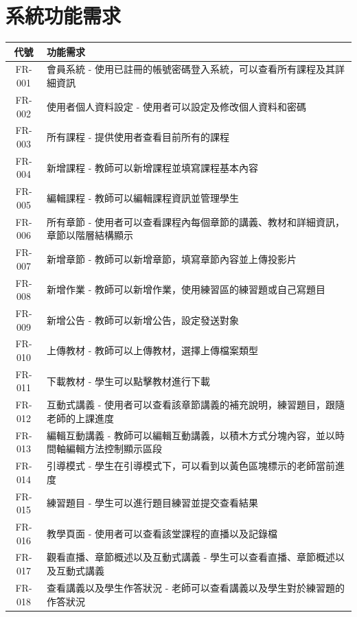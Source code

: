 \documentclass[12pt]{article}
\begin{document}
\section{系統功能需求}

\begin{table}[H]
  \centering
  \begin{tabular}{|c|p{15cm}|}
    \hline
    \textbf{代號} & \textbf{功能需求} \\
    \hline
    FR-001 & 會員系統 - 使用已註冊的帳號密碼登入系統，可以查看所有課程及其詳細資訊 \\  \hline
    FR-002 & 使用者個人資料設定 - 使用者可以設定及修改個人資料和密碼 \\  \hline
    FR-003 & 所有課程 - 提供使用者查看目前所有的課程 \\  \hline
    FR-004 & 新增課程 - 教師可以新增課程並填寫課程基本內容 \\  \hline
    FR-005 & 編輯課程 - 教師可以編輯課程資訊並管理學生 \\  \hline
    FR-006 & 所有章節 - 使用者可以查看課程內每個章節的講義、教材和詳細資訊，章節以階層結構顯示 \\  \hline
    FR-007 & 新增章節 - 教師可以新增章節，填寫章節內容並上傳投影片 \\  \hline
    FR-008 & 新增作業 - 教師可以新增作業，使用練習區的練習題或自己寫題目 \\  \hline
    FR-009 & 新增公告 - 教師可以新增公告，設定發送對象 \\  \hline
    FR-010 & 上傳教材 - 教師可以上傳教材，選擇上傳檔案類型 \\  \hline
    FR-011 & 下載教材 - 學生可以點擊教材進行下載 \\  \hline
    FR-012 & 互動式講義 - 使用者可以查看該章節講義的補充說明，練習題目，跟隨老師的上課進度 \\  \hline
    FR-013 & 編輯互動講義 - 教師可以編輯互動講義，以積木方式分塊內容，並以時間軸編輯方法控制顯示區段 \\  \hline
    FR-014 & 引導模式 - 學生在引導模式下，可以看到以黃色區塊標示的老師當前進度 \\  \hline
    FR-015 & 練習題目 - 學生可以進行題目練習並提交查看結果 \\  \hline
    FR-016 & 教學頁面 - 使用者可以查看該堂課程的直播以及記錄檔 \\  \hline
    FR-017 & 觀看直播、章節概述以及互動式講義 - 學生可以查看直播、章節概述以及互動式講義 \\  \hline
    FR-018 & 查看講義以及學生作答狀況 - 老師可以查看講義以及學生對於練習題的作答狀況 \\  \hline

\end{tabular}
\end{table}
\end{document}
